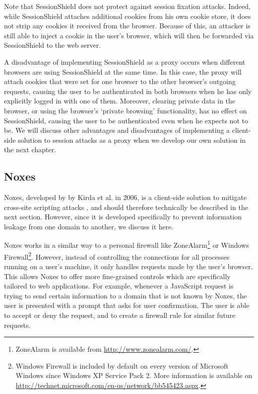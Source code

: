 Note that SessionShield does not protect against session fixation attacks. Indeed, while SessionShield attaches additional cookies from his own cookie store, it does not strip any cookies it received from the browser. Because of this, an attacker is still able to inject a cookie in the user's browser, which will then be forwarded via SessionShield to the web server.

A disadvantage of implementing SessionShield as a proxy occurs when different browsers are using SessionShield at the same time. In this case, the proxy will attach cookies that were set for one browser to the other browser's outgoing requests, causing the user to be authenticated in both browsers when he has only explicitly logged in with one of them. Moreover, clearing private data in the browser, or using the browser's `private browsing' functionality, has no effect on SessionShield, causing the user to be authenticated even when he expects not to be. We will discuss other advantages and disadvantages of implementing a client-side solution to session attacks as a proxy when we develop our own solution in the next chapter.

\subsection{Noxes}\label{noxes}

Noxes, developed by by Kirda et al. in 2006, is a client-side solution to mitigate cross-site scripting attacks \cite{Kirda2006}, and should therefore technically be described in the next section. However, since it is developed specifically to prevent information leakage from one domain to another, we discuss it here.

Noxes works in a similar way to a personal firewall like ZoneAlarm\footnote{ZoneAlarm is available from \url{http://www.zonealarm.com/}.} or Windows Firewall\footnote{Windows Firewall is included by default on every version of Microsoft Windows since Windows XP Service Pack 2. More information is available on \url{http://technet.microsoft.com/en-us/network/bb545423.aspx}.}. However, instead of controlling the connections for all processes running on a user's machine, it only handles requests made by the user's browser. This allows Noxes to offer more fine-grained controls which are specifically tailored to web applications. For example, whenever a JavaScript request is trying to send certain information to a domain that is not known by Noxes, the user is presented with a prompt that asks for user confirmation. The user is able to accept or deny the request, and to create a firewall rule for similar future requests.

